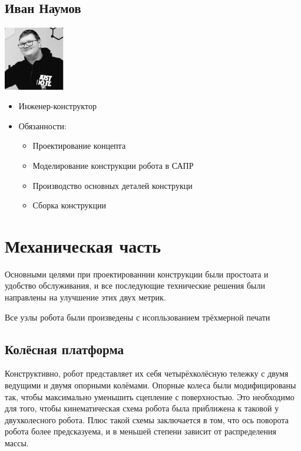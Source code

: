 \documentclass[11pt]{article}
\begin{document}
\subsection{Иван Наумов}
\label{sec:org3defa85}
\begin{center}
\includegraphics[width=100]{./images/ivan.jpg}
\end{center}
\begin{itemize}
\item Инженер-конструктор
\item Обязанности:
\begin{itemize}
\item Проектирование концепта
\item Моделирование конструкции робота в САПР
\item Производство основных деталей конструкци
\item Сборка конструкции
\end{itemize}
\end{itemize}
\section{Механическая часть}
\label{sec:orgf711d27}
Основными целями при проектированнии конструкции были простоата и удобство обслуживания, и все последующие технические решения были направлены на улучшение этих двух метрик.

Все узлы робота были произведены с исопльзованием трёхмерной печати
\subsection{Колёсная платформа}
\label{sec:orgb6c2fcf}
Конструктивно, робот представляет их себя четырёхколёсную тележку с двумя ведущими и двумя опорными колёмами. Опорные колеса были модифицированы так, чтобы максимально уменьшить сцепление с поверхностью. Это необходимо для того, чтобы кинематическая схема робота была приближена к таковой у двухколесного робота. Плюс такой схемы заключается в том, что ось поворота робота более предсказуема, и в меньшей степени зависит от распределения массы.
\end{document}
